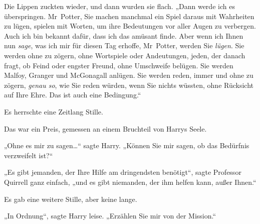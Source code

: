 Die Lippen zuckten wieder, und dann wurden sie flach. „Dann werde ich es überspringen. Mr~Potter, Sie machen manchmal ein Spiel daraus mit Wahrheiten zu lügen, spielen mit Worten, um ihre Bedeutungen vor aller Augen zu verbergen. Auch ich bin bekannt dafür, dass ich das amüsant finde. Aber wenn ich Ihnen nun \emph{sage}, was ich mir für diesen Tag erhoffe, Mr~Potter, werden Sie \emph{lügen}. Sie werden ohne zu zögern, ohne Wortspiele oder Andeutungen, jeden, der danach fragt, ob Feind oder engster Freund, ohne Umschweife belügen. Sie werden Malfoy, Granger und McGonagall anlügen. Sie werden reden, immer und ohne zu zögern, \emph{genau so}, wie Sie reden würden, wenn Sie nichts wüssten, ohne Rücksicht auf Ihre Ehre. Das ist auch eine Bedingung.“

Es herrschte eine Zeitlang Stille.

Das war ein Preis, gemessen an einem Bruchteil von Harrys Seele.

„Ohne es mir zu sagen…“ sagte Harry. „Können Sie mir sagen, ob das Bedürfnis verzweifelt ist?“

„Es gibt jemanden, der Ihre Hilfe am dringendsten benötigt“, sagte Professor Quirrell ganz einfach, „und es gibt niemanden, der ihm helfen kann, außer Ihnen.“

Es gab eine weitere Stille, aber keine lange.

„In Ordnung“, sagte Harry leise. „Erzählen Sie mir von der Mission.“

